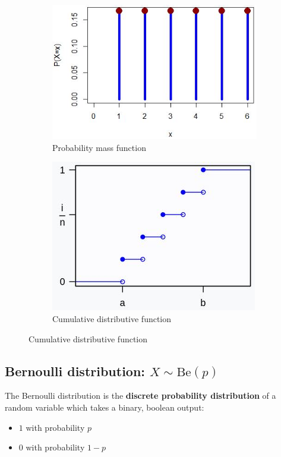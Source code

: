 \documentclass[10pt,a4paper]{article}
\begin{document}
\begin{figure} [h]
\centering
\begin{subfigure}{.5\textwidth}
  \centering
  \includegraphics[scale=0.52]{Uniform discrete.JPG}
  \caption{Probability mass function}
\end{subfigure}%
\begin{subfigure}{.5\textwidth}
  \centering
  \includegraphics[scale=0.6]{Uniform discrete CDF.JPG}
  \caption{Cumulative distributive function}
\end{subfigure}
\end{figure}

\pagebreak

\subsection{Bernoulli distribution: $X\sim \text{Be}(p)$}

The Bernoulli distribution is the \textbf{discrete probability distribution} of a random variable
which takes a binary, boolean output:
\begin{itemize}
    \item $1$ with probability $p$
    \item $0$ with probability $1-p$
\end{itemize} 
\end{document}
